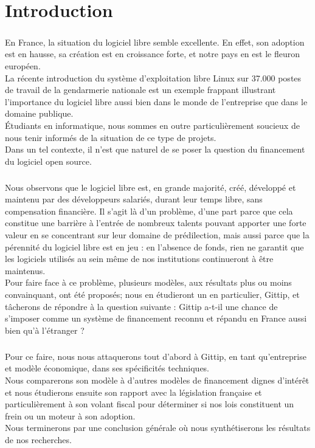 \chapter*{Introduction}

\paragraph{}
En France, la situation du logiciel libre semble excellente.
En effet, son adoption est en hausse, sa création est en croissance forte,
et notre pays en est le fleuron européen.\\
La récente introduction du système d'exploitation libre Linux sur 37.000
postes de travail de la gendarmerie nationale est un exemple frappant
illustrant l'importance du logiciel libre aussi bien dans le monde de
l'entreprise que dans le domaine publique.\\
Étudiants en informatique, nous sommes en outre particulièrement soucieux
de nous tenir informés de la situation de ce type de projets.\\
Dans un tel contexte, il n'est que naturel de se poser la question du
financement du logiciel open source.

\paragraph{}
Nous observons que le logiciel libre est, en grande majorité, créé,
développé et maintenu par des développeurs salariés, durant leur temps
libre, sans compensation financière. Il s'agit là d'un problème, d'une
part parce que cela constitue une barrière à l'entrée de nombreux talents
pouvant apporter une forte valeur en se concentrant sur leur domaine de
prédilection, mais aussi parce que la pérennité du logiciel libre est en
jeu : en l'absence de fonds, rien ne garantit que les logiciels utilisés
au sein même de nos institutions continueront à être maintenus.\\
Pour faire face à ce problème, plusieurs modèles, aux résultats plus ou
moins convainquant, ont été proposés; nous en étudieront un en
particulier, Gittip, et tâcherons de répondre à la question suivante :
Gittip a-t-il une chance de s'imposer comme un système de financement
reconnu et répandu en France aussi bien qu'à l'étranger ?

\paragraph{}
Pour ce faire, nous nous attaquerons tout d'abord à Gittip, en tant
qu'entreprise et modèle économique, dans ses spécificités techniques.\\
Nous comparerons son modèle à d'autres modèles de financement
dignes d'intérêt et nous étudierons ensuite son rapport avec la législation
française et particulièrement à son volant fiscal pour déterminer si nos
lois constituent un frein ou un moteur à son adoption.\\
Nous terminerons par une conclusion générale où nous synthétiserons
les résultats de nos recherches.
